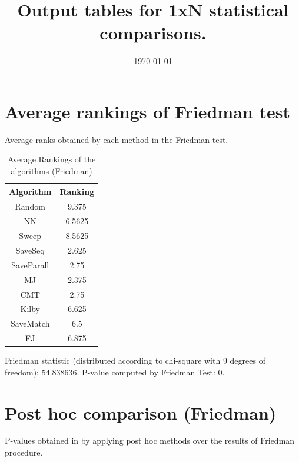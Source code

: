 \documentclass[a4paper,10pt]{article}
\title{Output tables for 1xN statistical comparisons.}
\author{}
\date{\today}
\begin{document}
\begin{landscape}
\pagestyle{empty}
\maketitle
\thispagestyle{empty}

\section{Average rankings of Friedman test}


Average ranks obtained by each method in the Friedman test.

\begin{table}[!htp]
\centering
\begin{tabular}{|c|c|}\hline
Algorithm&Ranking\\\hline
Random&9.375\\NN&6.5625\\Sweep&8.5625\\SaveSeq&2.625\\SaveParall&2.75\\MJ&2.375\\CMT&2.75\\Kilby&6.625\\SaveMatch&6.5\\FJ&6.875\\\hline\end{tabular}
\caption{Average Rankings of the algorithms (Friedman)}
\end{table}

Friedman statistic (distributed according to chi-square with 9 degrees of freedom): 54.838636. \newline P-value computed by Friedman Test: 0.\newline


\newpage

\section{Post hoc comparison (Friedman)}


P-values obtained in by applying post hoc methods over the results of Friedman procedure.


\end{landscape}
\end{document}
